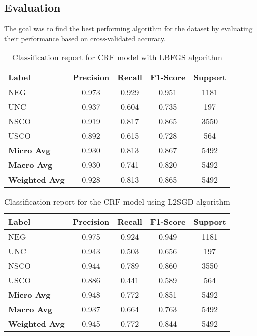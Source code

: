 \documentclass[9pt,a4paper,twoside]{tau-class/tau}
\begin{document}
    \subsection{Evaluation}
        The goal was to find the best performing algorithm for the dataset by evaluating their performance based on cross-validated accuracy. 

        \begin{table}[h]
        \centering
        \caption{Classification report for CRF model with LBFGS algorithm}
        \begin{tabular}{|l|c|c|c|c|}
        \hline
        \textbf{Label} & \textbf{Precision} & \textbf{Recall} & \textbf{F1-Score} & \textbf{Support} \\
        \hline
        NEG   & 0.973 & 0.929 & 0.951 & 1181 \\
        UNC   & 0.937 & 0.604 & 0.735 & 197  \\
        NSCO  & 0.919 & 0.817 & 0.865 & 3550 \\
        USCO  & 0.892 & 0.615 & 0.728 & 564  \\
        \hline
        \textbf{Micro Avg}    & 0.930 & 0.813 & 0.867 & 5492 \\
        \textbf{Macro Avg}    & 0.930 & 0.741 & 0.820 & 5492 \\
        \textbf{Weighted Avg} & 0.928 & 0.813 & 0.865 & 5492 \\
        \hline
        \end{tabular}
        \end{table}
      
        \begin{table}[h]
        \centering
        \caption{Classification report for the CRF model using L2SGD algorithm}
        \begin{tabular}{|l|c|c|c|c|}
        \hline
        \textbf{Label} & \textbf{Precision} & \textbf{Recall} & \textbf{F1-Score} & \textbf{Support} \\
        \hline
        NEG   & 0.975 & 0.924 & 0.949 & 1181 \\
        UNC   & 0.943 & 0.503 & 0.656 & 197  \\
        NSCO  & 0.944 & 0.789 & 0.860 & 3550 \\
        USCO  & 0.886 & 0.441 & 0.589 & 564  \\
        \hline
        \textbf{Micro Avg}    & 0.948 & 0.772 & 0.851 & 5492 \\
        \textbf{Macro Avg}    & 0.937 & 0.664 & 0.763 & 5492 \\
        \textbf{Weighted Avg} & 0.945 & 0.772 & 0.844 & 5492 \\
        \hline
        \end{tabular}
        \end{table}
\end{document}
